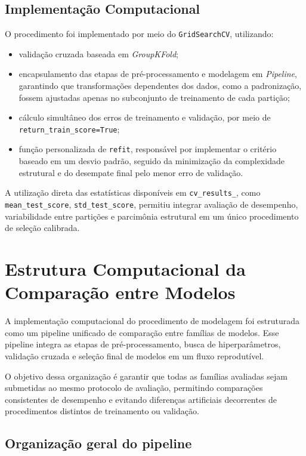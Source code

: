 \subsection{Implementação Computacional}

O procedimento foi implementado por meio do \texttt{GridSearchCV}, utilizando:

\begin{itemize}
    \item validação cruzada baseada em \textit{GroupKFold};
    \item encapsulamento das etapas de pré-processamento e modelagem em \textit{Pipeline}, garantindo que transformações dependentes dos dados, como a padronização, fossem ajustadas apenas no subconjunto de treinamento de cada partição;
    \item cálculo simultâneo dos erros de treinamento e validação, por meio de \texttt{return\_train\_score=True};
    \item função personalizada de \texttt{refit}, responsável por implementar o critério baseado em um desvio padrão, seguido da minimização da complexidade estrutural e do desempate final pelo menor erro de validação.
\end{itemize}

A utilização direta das estatísticas disponíveis em \texttt{cv\_results\_}, como \texttt{mean\_test\_score}, \texttt{std\_test\_score}, permitiu integrar avaliação de desempenho, variabilidade entre partições e parcimônia estrutural em um único procedimento de seleção calibrada.
\section{Estrutura Computacional da Comparação entre Modelos}

A implementação computacional do procedimento de modelagem foi estruturada como um pipeline unificado de comparação entre famílias de modelos. Esse pipeline integra as etapas de pré-processamento, busca de hiperparâmetros, validação cruzada e seleção final de modelos em um fluxo reprodutível.

O objetivo dessa organização é garantir que todas as famílias avaliadas sejam submetidas ao mesmo protocolo de avaliação, permitindo comparações consistentes de desempenho e evitando diferenças artificiais decorrentes de procedimentos distintos de treinamento ou validação.

\subsection{Organização geral do pipeline}

